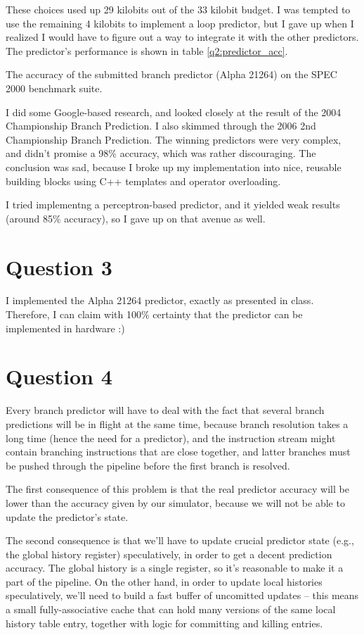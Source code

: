 These choices used up 29 kilobits out of the 33 kilobit budget. I was tempted
to use the remaining 4 kilobits to implement a loop predictor, but I gave up
when I realized I would have to figure out a way to integrate it with the other
predictors. The predictor's performance is shown in table
\ref{q2:predictor_acc}.

\begin{table}[htb]
\center

\caption{The accuracy of the submitted branch predictor (Alpha 21264) on the
SPEC 2000 benchmark suite. }
\label{q2:predictor_acc}
\end{table}

I did some Google-based research, and looked closely at the result of the 2004
Championship Branch Prediction. I also skimmed through the 2006 2nd
Championship Branch Prediction. The winning predictors were very complex, and
didn't promise a 98\% accuracy, which was rather discouraging. The conclusion
was sad, because I broke up my implementation into nice, reusable building
blocks using C++ templates and operator overloading.

I tried implementng a perceptron-based predictor, and it yielded weak results
(around 85\% accuracy), so I gave up on that avenue as well.

\section{Question 3}
I implemented the Alpha 21264 predictor, exactly as presented in class.
Therefore, I can claim with 100\% certainty that the predictor can be
implemented in hardware :)

\section{Question 4}
Every branch predictor will have to deal with the fact that several branch
predictions will be in flight at the same time, because branch resolution takes
a long time (hence the need for a predictor), and the instruction stream might
contain branching instructions that are close together, and latter branches must
be pushed through the pipeline before the first branch is resolved.

The first consequence of this problem is that the real predictor accuracy will
be lower than the accuracy given by our simulator, because we will not be able
to update the predictor's state.

The second consequence is that we'll have to update crucial predictor state
(e.g., the global history register) speculatively, in order to get a decent
prediction accuracy. The global history is a single register, so it's
reasonable to make it a part of the pipeline. On the other hand, in order to
update local histories speculatively, we'll need to build a fast buffer of
uncomitted updates -- this means a small fully-associative cache that can hold
many versions of the same local history table entry, together with logic for
committing and killing entries.
